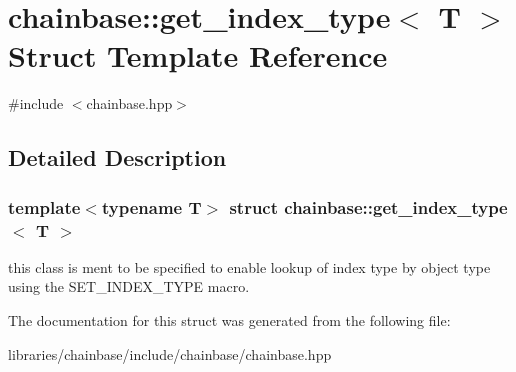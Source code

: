 \hypertarget{structchainbase_1_1get__index__type}{}\section{chainbase\+:\+:get\+\_\+index\+\_\+type$<$ T $>$ Struct Template Reference}
\label{structchainbase_1_1get__index__type}


{\ttfamily \#include $<$chainbase.\+hpp$>$}



\subsection{Detailed Description}
\subsubsection*{template$<$typename T$>$\newline
struct chainbase\+::get\+\_\+index\+\_\+type$<$ T $>$}

this class is ment to be specified to enable lookup of index type by object type using the S\+E\+T\+\_\+\+I\+N\+D\+E\+X\+\_\+\+T\+Y\+PE macro. 

The documentation for this struct was generated from the following file\+:\begin{DoxyCompactItemize}
\item 
libraries/chainbase/include/chainbase/chainbase.\+hpp\end{DoxyCompactItemize}
